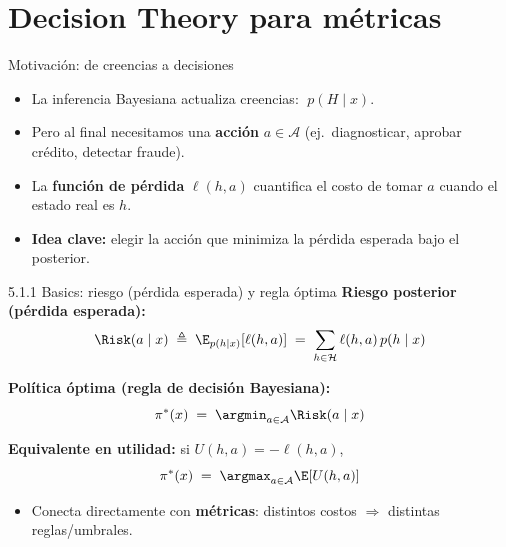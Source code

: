 
\section{Decision Theory para métricas}

\begin{frame}{Motivación: de creencias a decisiones}
\begin{itemize}
  \item La inferencia Bayesiana actualiza creencias: \(\;p(H\mid x)\).
  \item Pero al final necesitamos una \textbf{acción} \(a \in \mathcal{A}\) (ej.\ diagnosticar, aprobar crédito, detectar fraude).
  \item La \textbf{función de pérdida} \(\ell(h,a)\) cuantifica el costo de tomar \(a\) cuando el estado real es \(h\).
  \item \textbf{Idea clave:} elegir la acción que minimiza la pérdida esperada bajo el posterior.
\end{itemize}
\end{frame}

\begin{frame}{5.1.1 Basics: riesgo (pérdida esperada) y regla óptima}
\textbf{Riesgo posterior (pérdida esperada):}
\[
\Risk(a\mid x) \;\triangleq\; \E_{p(h\mid x)}[\ell(h,a)]
\;=\;\sum_{h\in \mathcal{H}} \ell(h,a)\,p(h\mid x)
\]

\textbf{Política óptima (regla de decisión Bayesiana):}
\[
\pi^*(x) \;=\;\argmin_{a\in \mathcal{A}} \Risk(a\mid x)
\]

\textbf{Equivalente en utilidad:} si \(U(h,a)=-\ell(h,a)\),
\[
\pi^*(x) \;=\;\argmax_{a\in \mathcal{A}} \E[U(h,a)]
\]

\vspace{0.4em}
\begin{itemize}
  \item Conecta directamente con \textbf{métricas}: distintos costos \(\Rightarrow\) distintas reglas/umbrales.
\end{itemize}
\end{frame}

